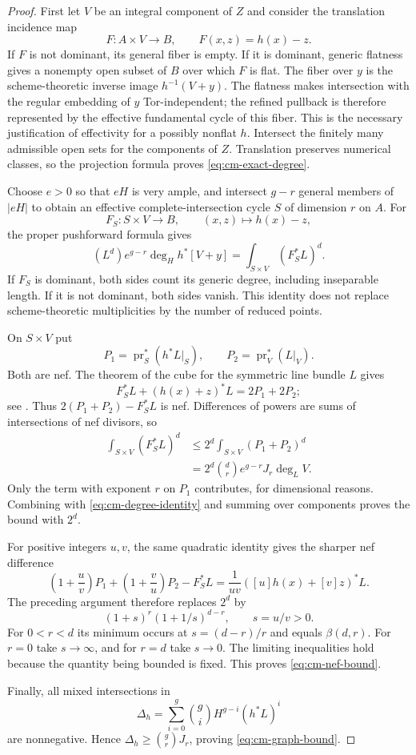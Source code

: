 \begin{proof}
First let $V$ be an integral component of $Z$ and consider the translation incidence map
\[
F:A\times V\longrightarrow B,\qquad F(x,z)=h(x)-z.
\]
If $F$ is not dominant, its general fiber is empty. If it is dominant, generic flatness gives a nonempty open subset of $B$ over which $F$ is flat. The fiber over $y$ is the scheme-theoretic inverse image $h^{-1}(V+y)$. The flatness makes intersection with the regular embedding of $y$ Tor-independent; the refined pullback is therefore represented by the effective fundamental cycle of this fiber. This is the necessary justification of effectivity for a possibly nonflat $h$. Intersect the finitely many admissible open sets for the components of $Z$. Translation preserves numerical classes, so the projection formula proves \eqref{eq:cm-exact-degree}.

Choose $e>0$ so that $eH$ is very ample, and intersect $g-r$ general members of $|eH|$ to obtain an effective complete-intersection cycle $S$ of dimension $r$ on $A$. For
\[
F_S:S\times V\longrightarrow B,\qquad (x,z)\longmapsto h(x)-z,
\]
the proper pushforward formula gives
\begin{equation}
(L^d)e^{g-r}\deg_Hh^*[V+y]
=\int_{S\times V}(F_S^*L)^d.
\label{eq:cm-degree-identity}
\end{equation}
If $F_S$ is dominant, both sides count its generic degree, including inseparable length. If it is not dominant, both sides vanish. This identity does not replace scheme-theoretic multiplicities by the number of reduced points.

On $S\times V$ put
\[
P_1=\operatorname{pr}_S^*(h^*L|_S),\qquad
P_2=\operatorname{pr}_V^*(L|_V).
\]
Both are nef. The theorem of the cube for the symmetric line bundle $L$ gives
\[
F_S^*L+(h(x)+z)^*L=2P_1+2P_2;
\]
see \cite[Corollaries 6.4--6.6]{MilneAV}. Thus $2(P_1+P_2)-F_S^*L$ is nef. Differences of powers are sums of intersections of nef divisors, so
\begin{align*}
\int_{S\times V}(F_S^*L)^d
&\leq 2^d\int_{S\times V}(P_1+P_2)^d\\
&=2^d\binom dr e^{g-r}J_r\deg_LV.
\end{align*}
Only the term with exponent $r$ on $P_1$ contributes, for dimensional reasons. Combining with \eqref{eq:cm-degree-identity} and summing over components proves the bound with $2^d$.

For positive integers $u,v$, the same quadratic identity gives the sharper nef difference
\[
\left(1+\frac uv\right)P_1+
\left(1+\frac vu\right)P_2-F_S^*L
=\frac1{uv}([u]h(x)+[v]z)^*L.
\]
The preceding argument therefore replaces $2^d$ by
\[
(1+s)^r(1+1/s)^{d-r},\qquad s=u/v>0.
\]
For $0<r<d$ its minimum occurs at $s=(d-r)/r$ and equals $\beta(d,r)$. For $r=0$ take $s\to\infty$, and for $r=d$ take $s\to0$. The limiting inequalities hold because the quantity being bounded is fixed. This proves \eqref{eq:cm-nef-bound}.

Finally, all mixed intersections in
\[
\Delta_h=\sum_{i=0}^g\binom giH^{g-i}(h^*L)^i
\]
are nonnegative. Hence $\Delta_h\geq\binom grJ_r$, proving \eqref{eq:cm-graph-bound}.
\end{proof}

